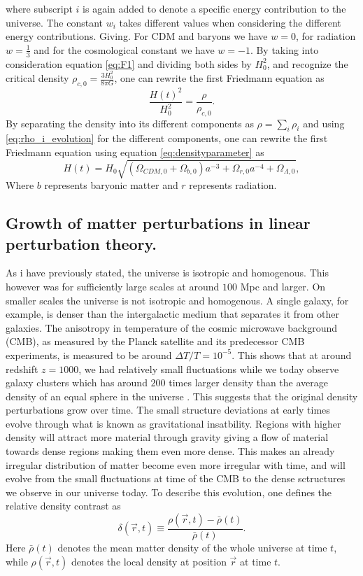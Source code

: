 where subscript $i$ is again added to denote a specific energy contribution to
the universe. The constant $w_i$ takes different values when considering the
different energy contributions. Giving. For CDM and baryons we have $w=0$, for
radiation $w=\frac{1}{3}$ and for the cosmological constant we have $w=-1$. By
taking into consideration equation \ref{eq:F1} and dividing both sides by $H_0^2$,
and recognize the critical density $\rho_{c,0}=\frac{3H_0^2}{8\pi G}$, one can
rewrite the first Friedmann equation as
\begin{equation}
    \frac{H(t)^2}{H_0^2}=\frac{\rho}{\rho_{c,0}}.
\end{equation}
By separating the density into its different components as $\rho=\sum_i\rho_i$
and using \ref{eq:rho_i_evolution} for the different components, one can rewrite
the first Friedmann equation using equation \ref{eq:densityparameter} as
\begin{equation}
    H(t)=H_0\sqrt{(\Omega_{CDM,0} + \Omega_{b,0})a^{-3} + \Omega_{r,0}a^{-4} + \Omega_{\Lambda,0}},
\end{equation}
Where $b$ represents baryonic matter and $r$ represents radiation.

\subsection{Growth of matter perturbations in linear perturbation theory.}\label{sec:linpert}
As i have previously stated, the universe is isotropic and homogenous. This
however was for sufficiently large scales at around $100$ Mpc and larger. On
smaller scales the universe is not isotropic and homogenous. A single galaxy,
for example, is denser than the intergalactic medium that separates it from other
galaxies. The anisotropy in temperature of the cosmic microwave background (CMB), as measured by
the Planck satellite and its predecessor CMB experiments, is measured to be
around $\Delta T/T=10^{-5}$. This shows that at around redshift $z=1000$, we had
relatively small fluctuations while we today observe galaxy clusters which has around
$200$ times larger density than the average density of an equal sphere in the
universe \cite[p.~342]{schneider2006extragalactic}. This suggests that the original density
perturbations grow over time. The small structure deviations at early times evolve through what is known as gravitational insatbility.
Regions with higher density will attract more material through gravity giving a flow of material towards dense regions making them even more dense.
This makes an already irregular distribution of matter become even more irregular with time, and will evolve from the small fluctuations at time of the CMB
to the dense sctructures we observe in our universe today.
To describe this evolution, one defines the relative density
contrast as
\begin{equation}
    \delta(\vec{r}, t) \equiv \frac{\rho(\vec{r}, t) - \bar{\rho}(t)}{\bar{\rho}(t)}.
\end{equation}
Here $\bar{\rho}(t)$ denotes the mean matter density of the whole universe at
time $t$, while $\rho(\vec{r}, t)$ denotes the local density at position
$\vec{r}$ at time $t$.\\

